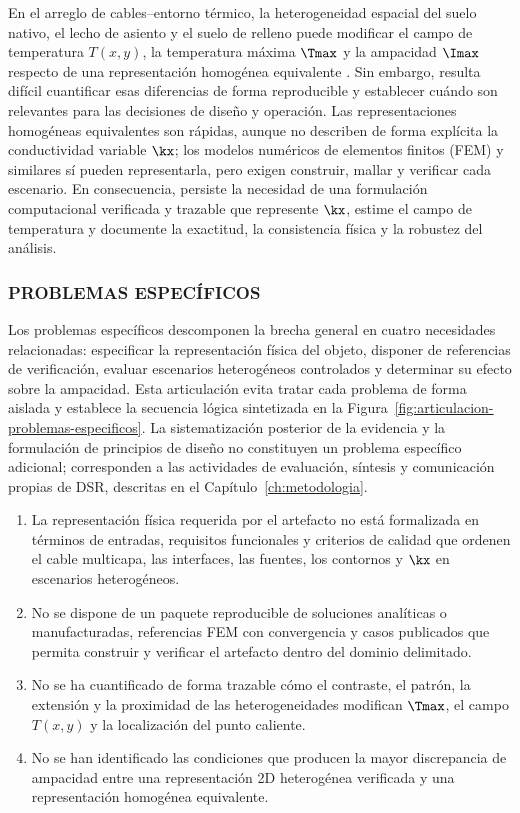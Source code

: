 En el arreglo de cables--entorno térmico, la heterogeneidad espacial del suelo nativo, el lecho de asiento y el suelo de relleno puede modificar el campo de temperatura $T(x,y)$, la temperatura máxima $\Tmax$ y la ampacidad $\Imax$ respecto de una representación homogénea equivalente \parencites[4--6]{enescu2021}[3--4,93--99]{cigre2025}. Sin embargo, resulta difícil cuantificar esas diferencias de forma reproducible y establecer cuándo son relevantes para las decisiones de diseño y operación. Las representaciones homogéneas equivalentes son rápidas, aunque no describen de forma explícita la conductividad variable $\kx$; los modelos numéricos de elementos finitos (FEM) y similares sí pueden representarla, pero exigen construir, mallar y verificar cada escenario. En consecuencia, persiste la necesidad de una formulación computacional verificada y trazable que represente $\kx$, estime el campo de temperatura y documente la exactitud, la consistencia física y la robustez del análisis.

\subsubsection{PROBLEMAS ESPECÍFICOS}

Los problemas específicos descomponen la brecha general en cuatro necesidades relacionadas: especificar la representación física del objeto, disponer de referencias de verificación, evaluar escenarios heterogéneos controlados y determinar su efecto sobre la ampacidad. Esta articulación evita tratar cada problema de forma aislada y establece la secuencia lógica sintetizada en la Figura~\ref{fig:articulacion-problemas-especificos}. La sistematización posterior de la evidencia y la formulación de principios de diseño no constituyen un problema específico adicional; corresponden a las actividades de evaluación, síntesis y comunicación propias de DSR, descritas en el Capítulo~\ref{ch:metodologia}.

\begin{enumerate}[label=PE\arabic*.]
  \item La representación física requerida por el artefacto no está formalizada en términos de entradas, requisitos funcionales y criterios de calidad que ordenen el cable multicapa, las interfaces, las fuentes, los contornos y $\kx$ en escenarios heterogéneos.
  \item No se dispone de un paquete reproducible de soluciones analíticas o manufacturadas, referencias FEM con convergencia y casos publicados que permita construir y verificar el artefacto dentro del dominio delimitado.
  \item No se ha cuantificado de forma trazable cómo el contraste, el patrón, la extensión y la proximidad de las heterogeneidades modifican $\Tmax$, el campo $T(x,y)$ y la localización del punto caliente.
  \item No se han identificado las condiciones que producen la mayor discrepancia de ampacidad entre una representación 2D heterogénea verificada y una representación homogénea equivalente.
\end{enumerate}

